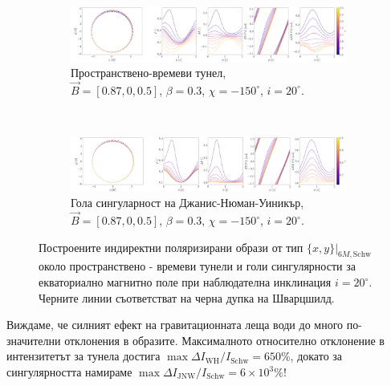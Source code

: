 \documentclass[12pt]{article}
\numberwithin{equation}{section}
\numberwithin{figure}{section}
\begin{document}
		
	\begin{figure}[!htb]
		\begin{subfigure}{16cm}
			\hspace{-1.0em}
			\includegraphics[scale = 0.15]{Section_7_Polarized_Emission/WH_delta_fig_B_0.87_0.5_0_20_deg_r6_n1.png}
			\caption{Пространствено-времеви тунел,\\ $\vec{B} = [0.87, 0, 0.5]$, $\beta = 0.3$, $\chi = -150^\circ$, $i = 20^\circ$.} 
		\end{subfigure}\\
		\begin{subfigure}{17cm}
			\hspace{-1.0em}
			\includegraphics[scale = 0.15]{Section_7_Polarized_Emission/JNW_delta_fig_B_0.87_0.5_0_20_deg_r6_n1.png}
			\caption{Гола сингуларност на Джанис-Нюман-Уиникър,\\  $\vec{B} = [0.87, 0, 0.5]$, $\beta = 0.3$, $\chi = -150^\circ$, $i = 20^\circ$.}
		\end{subfigure}
		\caption[Поляризирани индиректни образи около пространствено - времеви тунели и голи сингулярности за екваториално магнитно поле при $i = 20^\circ$.]{\small Построените индиректни поляризирани образи от тип $\{x,y\}\vert_{6M, \text{Schw}}$ около пространствено - времеви тунели  и голи сингулярности за екваториално магнитно поле при наблюдателна инклинация $i = 20^\circ$. Черните линии съответстват на черна дупка на Шварцшилд.} 
		\label{Inirect_image_deltas_20}
	\end{figure}
	
	Виждаме, че силният ефект на гравитационната леща води до много по-значителни отклонения в образите. Максималното относително отклонение в интензитетът за тунела достига $\max \Delta I_\text{WH} / I_{\text{Schw}} = 650\%$, докато за сингулярността намираме $\max \Delta I_\text{JNW} / I_{\text{Schw}} = 6\times10^3\%$!\\
	
\end{document}
